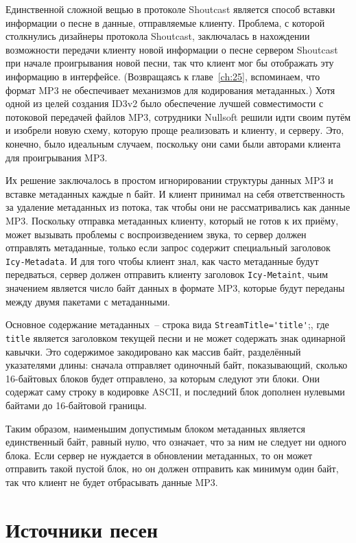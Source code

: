 Единственной сложной вещью в протоколе Shoutcast является способ вставки
информации о песне в данные, отправляемые клиенту.  Проблема, с которой столкнулись
дизайнеры протокола Shoutcast, заключалась в нахождении возможности передачи клиенту новой
информации о песне сервером Shoutcast при начале проигрывания новой песни, так что клиент
мог бы отображать эту информацию в интерфейсе. (Возвращаясь к главе~\ref{ch:25},
вспоминаем, что формат MP3 не обеспечивает механизмов для кодирования метаданных.)  Хотя
одной из целей создания ID3v2 было обеспечение лучшей совместимости с потоковой передачей
файлов MP3, сотрудники Nullsoft решили идти своим путём и изобрели новую схему, которую
проще реализовать и клиенту, и серверу.  Это, конечно, было идеальным случаем, поскольку они
сами были авторами клиента для проигрывания MP3.

Их решение заключалось в простом игнорировании структуры данных MP3 и вставке метаданных
каждые \lstinline{n} байт.  И клиент принимал на себя ответственность за удаление метаданных из
потока, так чтобы они не рассматривались как данные MP3.  Поскольку отправка метаданных
клиенту, который не готов к их приёму, может вызывать проблемы с воспроизведением звука,
то сервер должен отправлять метаданные, только если запрос содержит специальный заголовок
\lstinline{Icy-Metadata}.  И для того чтобы клиент знал, как часто метаданные будут
передваться, сервер должен отправить клиенту заголовок \lstinline{Icy-Metaint}, чьим значением
является число байт данных в формате MP3, которые будут переданы между двумя пакетами с
метаданными.

Основное содержание метаданных~-- строка вида \lstinline{StreamTitle='title'};, где
\lstinline{title} является заголовком текущей песни и не может содержать знак одинарной
кавычки.  Это содержимое закодировано как массив байт, разделённый указателями длины:
сначала отправляет одиночный байт, показывающий, сколько 16-байтовых блоков будет
отправлено, за которым следуют эти блоки.  Они содержат саму строку в кодировке ASCII, и
последний блок дополнен нулевыми байтами до 16-байтовой границы.

Таким образом, наименьшим допустимым блоком метаданных является единственный байт, равный
нулю, что означает, что за ним не следует ни одного блока.  Если сервер не нуждается в
обновлении метаданных, то он может отправить такой пустой блок, но он должен отправить как
минимум один байт, так что клиент не будет отбрасывать данные MP3.

\section{Источники песен}

